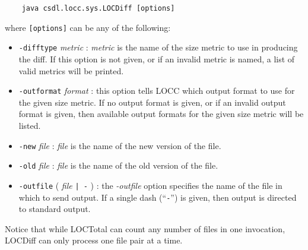 \begin{verbatim}    java csdl.locc.sys.LOCDiff [options]\end{verbatim}

where {\tt [options]} can be any of the following:

\begin{itemize}

\item {\tt -difftype} {\em metric} : {\em metric} is the name of the size
      metric to use in producing the diff.  If this option is not
      given, or if an invalid metric is named, a list of valid metrics 
      will be printed.

\item {\tt -outformat} {\em format} : this option tells LOCC which output
      format to use for the given size metric.  If no output format is 
      given, or if an invalid output format is given, then available
      output formats for the given size metric will be listed.

\item {\tt -new} {\em file} : {\em file} is the name of the new version of
      the file.

\item {\tt -old} {\em file} : {\em file} is the name of the old version of
      the file.

\item {\tt -outfile} ( {\em file} {\tt | -} ) : the {\em -outfile} option specifies
      the name of the file in which to send output.  If a single dash
      (``{\tt -}'') is given, then output is directed to standard
      output.  
              
\end{itemize}

Notice that while LOCTotal can count any number of files in one
invocation, LOCDiff can only process one file pair at a time.
